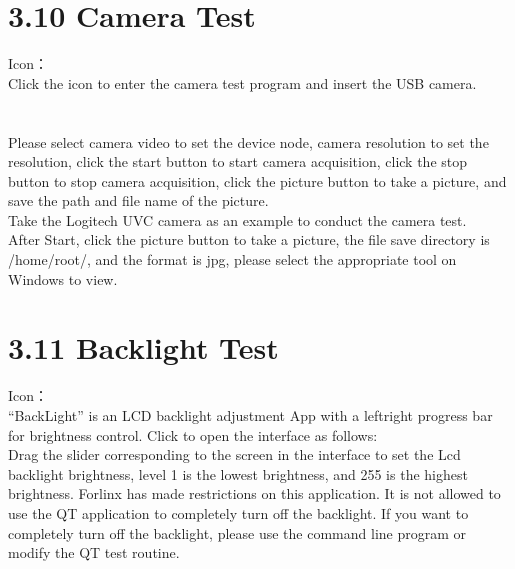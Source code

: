 \documentclass[letterpaper,10pt,openany,english]{sphinxmanual}
\begin{document}
\section{3.10 Camera Test}
\label{\detokenize{linux-manual:camera-test}}
\sphinxAtStartPar
Icon：\\
Click the icon to enter the camera test program and insert the USB camera.\\
\\
\\
Please select camera video to set the device node, camera resolution to set the resolution, click the start button to start camera acquisition, click the stop button to stop camera acquisition, click the picture button to take a picture, and save the path and file name of the picture.\\
Take the Logitech UVC camera as an example to conduct the camera test.\\
After Start, click the picture button to take a picture, the file save directory is /home/root/, and the format is jpg, please select the appropriate tool on Windows to view.


\section{3.11 Backlight Test}
\label{\detokenize{linux-manual:backlight-test}}
\sphinxAtStartPar
Icon：\\
“BackLight” is an LCD backlight adjustment App with a left\sphinxhyphen{}right progress bar for brightness control. Click to open the interface as follows:\\
Drag the slider corresponding to the screen in the interface to set the Lcd backlight brightness, level 1 is the lowest brightness, and 255 is the highest brightness. Forlinx has made restrictions on this application. It is not allowed to use the QT application to completely turn off the backlight. If you want to completely turn off the backlight, please use the command line program or modify the QT test routine.
\end{document}

